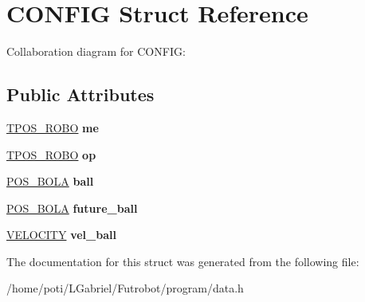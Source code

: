 \hypertarget{structCONFIG}{}\section{C\+O\+N\+F\+IG Struct Reference}
\label{structCONFIG}


Collaboration diagram for C\+O\+N\+F\+IG\+:
\subsection*{Public Attributes}
\begin{DoxyCompactItemize}
\item 
\hyperlink{structTPOS__ROBO}{T\+P\+O\+S\+\_\+\+R\+O\+BO} {\bfseries me}\hypertarget{structCONFIG_ad65b86d10fd8e8b560c954aa83ad4c57}{}\label{structCONFIG_ad65b86d10fd8e8b560c954aa83ad4c57}

\item 
\hyperlink{structTPOS__ROBO}{T\+P\+O\+S\+\_\+\+R\+O\+BO} {\bfseries op}\hypertarget{structCONFIG_a94c6cc1c4e48db2848c25c617c222a0f}{}\label{structCONFIG_a94c6cc1c4e48db2848c25c617c222a0f}

\item 
\hyperlink{structPOS__BOLA}{P\+O\+S\+\_\+\+B\+O\+LA} {\bfseries ball}\hypertarget{structCONFIG_ac02e8ba1a260624542348d1833f3a021}{}\label{structCONFIG_ac02e8ba1a260624542348d1833f3a021}

\item 
\hyperlink{structPOS__BOLA}{P\+O\+S\+\_\+\+B\+O\+LA} {\bfseries future\+\_\+ball}\hypertarget{structCONFIG_a197c247a4a55fb1c3a415d365e338604}{}\label{structCONFIG_a197c247a4a55fb1c3a415d365e338604}

\item 
\hyperlink{structVELOCITY}{V\+E\+L\+O\+C\+I\+TY} {\bfseries vel\+\_\+ball}\hypertarget{structCONFIG_a623d827decaeb945fa289ec5b6618abe}{}\label{structCONFIG_a623d827decaeb945fa289ec5b6618abe}

\end{DoxyCompactItemize}


The documentation for this struct was generated from the following file\+:\begin{DoxyCompactItemize}
\item 
/home/poti/\+L\+Gabriel/\+Futrobot/program/data.\+h\end{DoxyCompactItemize}
